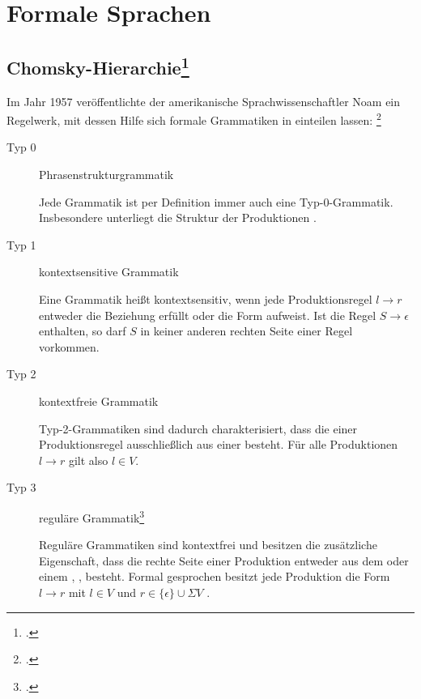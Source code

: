 \documentclass{lehramt-informatik-haupt}
\begin{document}
\chapter{Formale Sprachen}

\section{Chomsky-Hierarchie\footcite{wiki:chomsky}}

Im Jahr 1957 veröffentlichte der amerikanische Sprachwissenschaftler
Noam  ein Regelwerk, mit dessen Hilfe sich formale
Grammatiken in  einteilen lassen:
\footcite[Seite 168]{hoffmann}

\begin{description}
\item[Typ 0] Phrasenstrukturgrammatik

Jede Grammatik ist per Definition immer auch eine Typ-0-Grammatik.
Insbesondere unterliegt die Struktur der Produktionen .

\item[Typ 1] kontextsensitive Grammatik

Eine Grammatik heißt kontextsensitiv, wenn jede Produktionsregel $l
\rightarrow r$ entweder die Beziehung  erfüllt
oder die Form  aufweist. Ist die Regel
$S \rightarrow \epsilon$ enthalten, so darf $S$ in keiner anderen
rechten Seite einer Regel vorkommen.

\item[Typ 2] kontextfreie Grammatik

Typ-2-Grammatiken sind dadurch charakterisiert, dass die  einer Produktionsregel ausschließlich aus einer  besteht. Für alle Produktionen $l \rightarrow r$ gilt also $l
\in V$.

\item[Typ 3] reguläre Grammatik\footcite[Seite 14]{theo:fs:1}

Reguläre Grammatiken sind kontextfrei und besitzen die zusätzliche
Eigenschaft, dass die rechte Seite einer Produktion entweder aus dem
 oder einem ,
, besteht. Formal gesprochen
besitzt jede Produktion die Form $l \rightarrow r$ mit $l \in V$ und $r
\in \{ \epsilon \} \cup \Sigma V$ .
\end{description}
\end{document}
